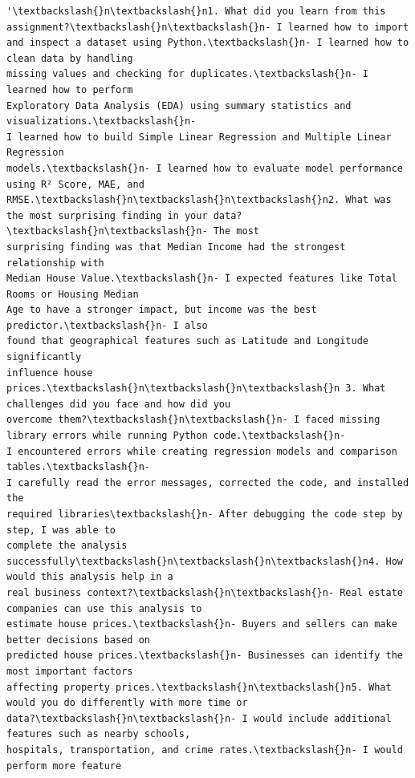 \documentclass[11pt]{article}
\makeatletter
\newcommand{\boxspacing}{\kern\kvtcb@left@rule\kern\kvtcb@boxsep}
\newcommand{\prompt}[4]{
        {\ttfamily\llap{{\color{#2}[#3]:\hspace{3pt}#4}}\vspace{-\baselineskip}}
    }
\makeatother
\begin{document}
            \begin{tcolorbox}[breakable, size=fbox, boxrule=.5pt, pad at break*=1mm, opacityfill=0]
\prompt{Out}{outcolor}{123}{\boxspacing}
\begin{Verbatim}[commandchars=\\\{\}]
'\textbackslash{}n\textbackslash{}n1. What did you learn from this assignment?\textbackslash{}n\textbackslash{}n- I learned how to import
and inspect a dataset using Python.\textbackslash{}n- I learned how to clean data by handling
missing values and checking for duplicates.\textbackslash{}n- I learned how to perform
Exploratory Data Analysis (EDA) using summary statistics and visualizations.\textbackslash{}n-
I learned how to build Simple Linear Regression and Multiple Linear Regression
models.\textbackslash{}n- I learned how to evaluate model performance using R² Score, MAE, and
RMSE.\textbackslash{}n\textbackslash{}n\textbackslash{}n2. What was the most surprising finding in your data?\textbackslash{}n\textbackslash{}n- The most
surprising finding was that Median Income had the strongest relationship with
Median House Value.\textbackslash{}n- I expected features like Total Rooms or Housing Median
Age to have a stronger impact, but income was the best predictor.\textbackslash{}n- I also
found that geographical features such as Latitude and Longitude significantly
influence house prices.\textbackslash{}n\textbackslash{}n\textbackslash{}n 3. What challenges did you face and how did you
overcome them?\textbackslash{}n\textbackslash{}n- I faced missing library errors while running Python code.\textbackslash{}n-
I encountered errors while creating regression models and comparison tables.\textbackslash{}n-
I carefully read the error messages, corrected the code, and installed the
required libraries\textbackslash{}n- After debugging the code step by step, I was able to
complete the analysis successfully\textbackslash{}n\textbackslash{}n\textbackslash{}n4. How would this analysis help in a
real business context?\textbackslash{}n\textbackslash{}n- Real estate companies can use this analysis to
estimate house prices.\textbackslash{}n- Buyers and sellers can make better decisions based on
predicted house prices.\textbackslash{}n- Businesses can identify the most important factors
affecting property prices.\textbackslash{}n\textbackslash{}n5. What would you do differently with more time or
data?\textbackslash{}n\textbackslash{}n- I would include additional features such as nearby schools,
hospitals, transportation, and crime rates.\textbackslash{}n- I would perform more feature

\end{Verbatim}
\end{tcolorbox}
\end{document}
